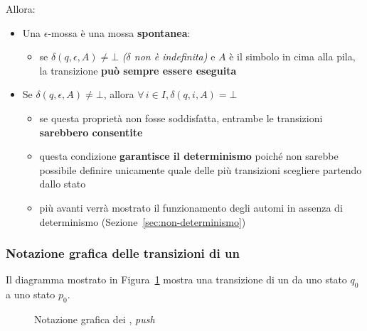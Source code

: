 \documentclass[italian, 10pt]{article}
\begin{document}
Allora:

\begin{itemize}
  \item Una \(\epsilon\)-mossa è una mossa \textbf{spontanea}:
        \begin{itemize}
          \item se \(\delta(q, \epsilon, A) \neq \bot \) \textit{(\(\delta\) non è indefinita)} e \(A\) è il simbolo in cima alla pila, la transizione \textbf{può sempre essere eseguita}
        \end{itemize}
  \item Se \(\delta(q, \epsilon, A) \neq \bot\), allora \(\forall \, i \in I, \delta(q, i, A) = \bot\)
        \begin{itemize}
          \item se questa proprietà non fosse soddisfatta, entrambe le transizioni \textbf{sarebbero consentite}
          \item questa condizione \textbf{garantisce il determinismo} poiché non sarebbe possibile definire unicamente quale delle più transizioni scegliere partendo dallo stato
          \item più avanti verrà mostrato il funzionamento degli automi in assenza di determinismo (Sezione~\ref{sec:non-determinismo})
        \end{itemize}
\end{itemize}

\subsubsection{Notazione grafica delle transizioni di un \PDA}

Il diagramma mostrato in Figura~\ref{fig:notazione-grafica-PDA-push} mostra una transizione di un \PDA da uno stato \(q_0\) a uno stato \(p_0\).

\begin{figure}[htbp]
  \bigskip
  \centering
  \caption{Notazione grafica dei \PDA, \textit{push}}
  \label{fig:notazione-grafica-PDA-push}
  \bigskip
\end{figure}
\end{document}
